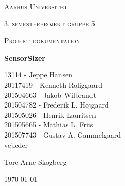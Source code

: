 \thispagestyle{empty}
	{\centering
	{\scshape\LARGE Aarhus Universitet \par}
	\vspace{1cm}
	{\scshape\Large 3. semesterprojekt gruppe 5\par}
	{\scshape\Large Projekt dokumentation\par}
	\vspace{1.5cm}
	{\huge\bfseries SensorSizer\par}
	\vspace{2cm}
	{\Large
	13114 - Jeppe Hansen\\ 
	20117419 - Kenneth Roliggaard\\
	201504663 - Jakob Wilbrandt\\ 
	201504782 - Frederik L. Højgaard\\ 
	201505026 - Henrik Lauritsen\\ 
	201505665 - Mathias L. Friis\\ 
	201507743 - Gustav A. Gammelgaard\\}
	\vfill
	vejleder\par
	Tore Arne Skogberg

	\vfill

	{\large \today\par}
\par}

